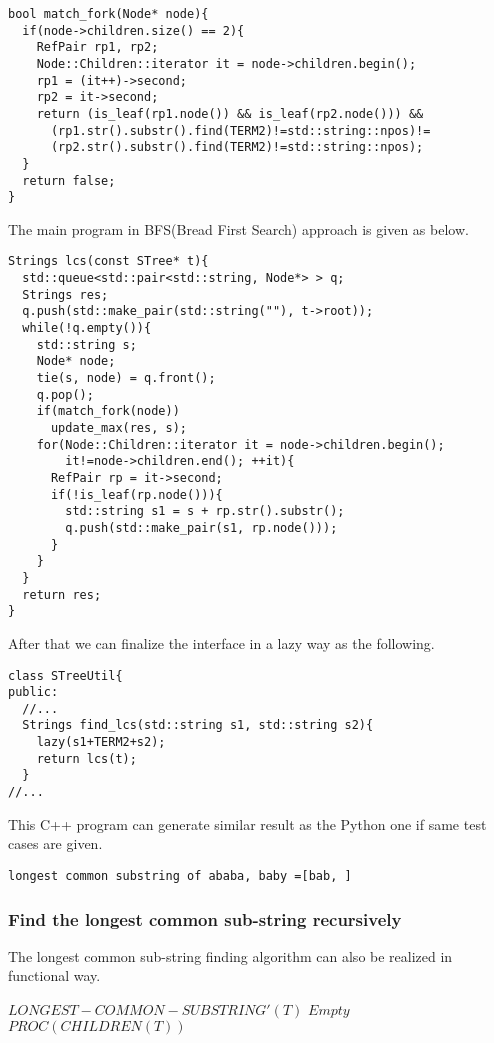 \documentclass{article}
\begin{document}
\begin{lstlisting}
bool match_fork(Node* node){
  if(node->children.size() == 2){
    RefPair rp1, rp2;
    Node::Children::iterator it = node->children.begin();
    rp1 = (it++)->second;
    rp2 = it->second;
    return (is_leaf(rp1.node()) && is_leaf(rp2.node())) &&
      (rp1.str().substr().find(TERM2)!=std::string::npos)!=
      (rp2.str().substr().find(TERM2)!=std::string::npos);
  }
  return false;
}
\end{lstlisting}

The main program in BFS(Bread First Search) approach is given
as below.

\begin{lstlisting}
Strings lcs(const STree* t){
  std::queue<std::pair<std::string, Node*> > q;
  Strings res;
  q.push(std::make_pair(std::string(""), t->root));
  while(!q.empty()){
    std::string s;
    Node* node;
    tie(s, node) = q.front();
    q.pop();
    if(match_fork(node))
      update_max(res, s);
    for(Node::Children::iterator it = node->children.begin();
        it!=node->children.end(); ++it){
      RefPair rp = it->second;
      if(!is_leaf(rp.node())){
        std::string s1 = s + rp.str().substr();
        q.push(std::make_pair(s1, rp.node()));
      }
    }
  }
  return res;
}
\end{lstlisting}

After that we can finalize the interface in a lazy way as the following.

\begin{lstlisting}
class STreeUtil{
public:
  //...
  Strings find_lcs(std::string s1, std::string s2){
    lazy(s1+TERM2+s2);
    return lcs(t);
  }
//...
\end{lstlisting}

This C++ program can generate similar result as the Python one if same
test cases are given.

\begin{verbatim}
longest common substring of ababa, baby =[bab, ]
\end{verbatim}

\subsubsection{Find the longest common sub-string recursively}
The longest common sub-string finding algorithm can also be
realized in functional way.

\begin{algorithmic}
\STATE $LONGEST-COMMON-SUBSTRING'(T)$
    \RETURN $Empty$
  \ELSE
    \RETURN $PROC(CHILDREN(T))$
  \ENDIF
\end{algorithmic}
\end{document}
